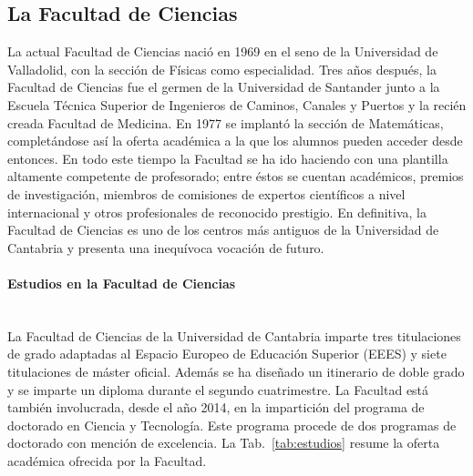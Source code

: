 \subsection{La Facultad de Ciencias}

La actual Facultad de Ciencias nació en 1969 en el seno de la Universidad de Valladolid, con la sección de Físicas como especialidad. Tres años después, la Facultad de Ciencias fue el germen de la Universidad de Santander junto a la Escuela Técnica Superior de Ingenieros de Caminos, Canales y Puertos y la recién creada Facultad de Medicina. En 1977 se implantó la sección de Matemáticas, completándose así la oferta académica a la que los alumnos pueden acceder desde
entonces. En todo este tiempo la Facultad se ha ido haciendo con una plantilla altamente competente de profesorado; entre éstos se cuentan académicos, premios de investigación, miembros de comisiones de expertos científicos a nivel internacional y otros profesionales de reconocido prestigio. En definitiva, la Facultad de Ciencias es uno de los centros más antiguos de la Universidad de Cantabria y presenta una inequívoca vocación de futuro. 

\paragraph{Estudios en la Facultad de Ciencias\\\\}

La Facultad de Ciencias de la Universidad de Cantabria imparte tres titulaciones de grado adaptadas al Espacio Europeo de Educación Superior (EEES) y siete titulaciones de máster oficial. Además se ha diseñado un itinerario de doble grado y se imparte un diploma durante el segundo cuatrimestre. La Facultad está también involucrada, desde el año 2014, en la impartición del programa de doctorado en Ciencia y Tecnología. Este programa procede de dos programas de doctorado con mención de excelencia. La Tab.~\ref{tab:estudios} resume la oferta académica ofrecida por la Facultad.

